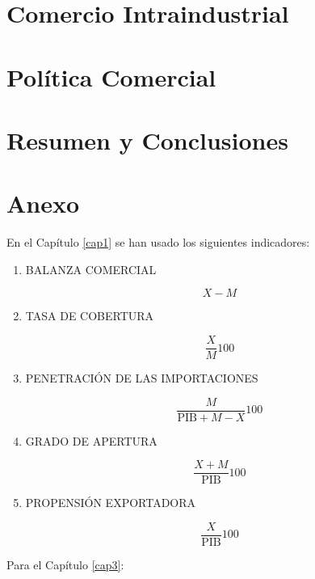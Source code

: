 \documentclass[a4paper,openright,12pt]{book}
\begin{document}
\chapter{Comercio Intraindustrial}

\chapter{Política Comercial}

\chapter{Resumen y Conclusiones}

\chapter{Anexo}

En el Capítulo \ref{cap1} se han usado los siguientes indicadores:

\begin{enumerate}

    \item BALANZA COMERCIAL

    $$X - M$$
    \item TASA DE COBERTURA

    $$\frac{X}{M}100$$
    \item PENETRACIÓN DE LAS IMPORTACIONES

    $$\frac{M}{\text{PIB} + M - X} 100$$
    \item GRADO DE APERTURA

    $$\frac{X+M}{\text{PIB}} 100$$
    \item PROPENSIÓN EXPORTADORA

    $$\frac{X}{\text{PIB}} 100$$

\end{enumerate}

Para el Capítulo \ref{cap3}:
\end{document}
